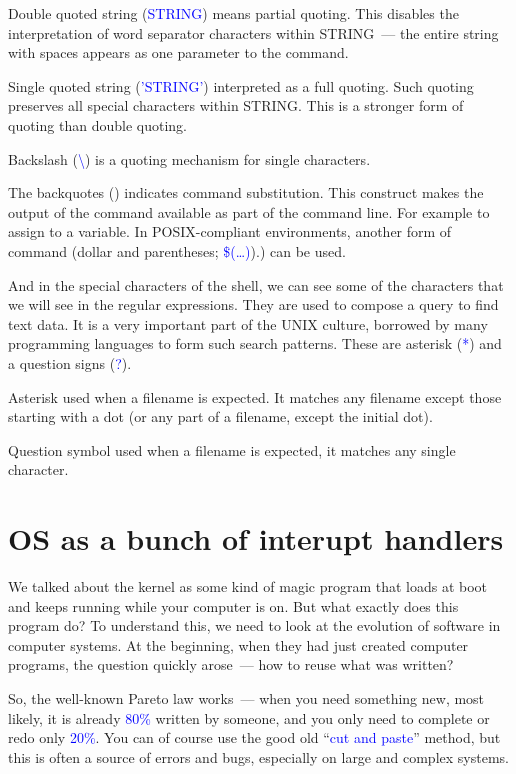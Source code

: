 \documentclass[12pt]{report}
\newcommand{\struct}[1]{\textcolor{blue}{#1}}
\begin{document}
\medskip
Double quoted string (\struct{\textquotedbl STRING\textquotedbl}) means partial
quoting. This disables the interpretation of word separator characters within
STRING~--- the entire string with spaces appears as one parameter to the command.

\medskip
Single quoted string (\struct{'STRING'}) interpreted as a full quoting.
Such quoting preserves all special characters within STRING.
This is a stronger form of quoting than double quoting.

\medskip
Backslash (\struct{\textbackslash}) is a quoting mechanism for single characters.

\medskip
The backquotes (\struct{\textasciigrave}) indicates command substitution.
This construct makes the output of the command available as part of
the command line. For example to assign to a variable. In POSIX-compliant
environments, another form of command (dollar and parentheses;
\struct{\$(\ldots)}).) can be used.

\medskip
And in the special characters of the shell, we can see some of the characters
that we will see in the regular expressions. They are used to compose
a query to find text data. It is a very important part of the UNIX culture,
borrowed by many programming languages to form such search patterns.
These are asterisk (\struct{*}) and a question signs (\struct{?}).

\medskip
Asterisk used when a filename is expected. It matches any filename except
those starting with a dot (or any part of a filename, except the initial dot).

\medskip
Question symbol used when a filename is expected, it matches any single
character.

\section*{OS as a bunch of interupt handlers}

We talked about the kernel as some kind of magic program that loads at boot and
keeps running while your computer is on. But what exactly does this program do?
To understand this, we need to look at the evolution of software in computer
systems. At the beginning, when they had just created computer programs,
the question quickly arose~--- how to reuse what was written?

\medskip
So, the well-known Pareto law works~--- when you need something new,
most likely, it is already \struct{80\%} written by someone, and you only need
to complete or redo only \struct{20\%}. You can of course use the good old
``\struct{cut and paste}'' method, but this is often a source of errors and bugs,
especially on large and complex systems.
\end{document}
